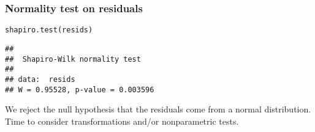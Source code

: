 \documentclass[color=usenames,dvipsnames]{beamer}\usepackage[]{graphicx}\usepackage[]{color}
\makeatletter
\newcommand{\hlstd}[1]{\textcolor[rgb]{0,0,0}{#1}}%
\newcommand{\hlkwd}[1]{\textcolor[rgb]{0.004,0.004,0.506}{#1}}%
\newenvironment{kframe}{%
 \def\at@end@of@kframe{}%
 \ifinner\ifhmode%
  \def\at@end@of@kframe{\end{minipage}}%
  \begin{minipage}{\columnwidth}%
 \fi\fi%
 \def\FrameCommand##1{\hskip\@totalleftmargin \hskip-\fboxsep
 \colorbox{shadecolor}{##1}\hskip-\fboxsep
     \hskip-\linewidth \hskip-\@totalleftmargin \hskip\columnwidth}%
 \MakeFramed {\advance\hsize-\width
   \@totalleftmargin\z@ \linewidth\hsize
   \@setminipage}}%
 {\par\unskip\endMakeFramed%
 \at@end@of@kframe}
\newenvironment{knitrout}{}{} %
\makeatother
\begin{document}
\begin{frame}[fragile]
  \frametitle{Normality test on residuals}
\begin{knitrout}
\color{fgcolor}\begin{kframe}
\begin{alltt}
\hlkwd{shapiro.test}\hlstd{(resids)}
\end{alltt}
\begin{verbatim}
## 
## 	Shapiro-Wilk normality test
## 
## data:  resids
## W = 0.95528, p-value = 0.003596
\end{verbatim}
\end{kframe}
\end{knitrout}
\pause
\vspace{0.6cm}
{We reject the null hypothesis that the residuals come from a normal
  distribution. Time to consider transformations and/or nonparametric
  tests.}
\end{frame}












\end{document}
